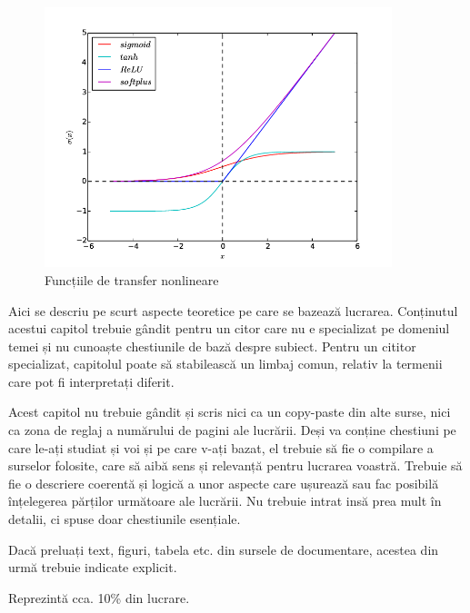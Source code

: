 \begin{figure}[h!]
    	\centering
	\captionsetup{justification=centering, margin=2cm}
	\includegraphics[width=0.9\textwidth]{figures/nonlinear_activation_functions.png}
	\caption{Funcțiile de transfer nonlineare \cite{non_lin_act_fun}}
	\label{fig:set of Gabor filters}
\end{figure}



\label{cap:fund-teoretice}

Aici se descriu pe scurt aspecte teoretice pe care se bazează lucrarea. Conținutul acestui capitol trebuie gândit pentru un citor care nu e specializat pe domeniul temei și nu cunoaște chestiunile de bază despre subiect. Pentru un cititor specializat, capitolul poate să stabilească un limbaj comun, relativ la termenii care pot fi interpretați diferit. 

Acest capitol nu trebuie gândit și scris nici ca un copy-paste din alte surse, nici ca zona de reglaj a numărului de pagini ale lucrării. Deși va conține chestiuni pe care le-ați studiat și voi și pe care v-ați bazat, el trebuie să fie o compilare a surselor folosite, care să aibă sens și relevanță pentru lucrarea voastră. Trebuie să fie o descriere coerentă și logică a unor aspecte care ușurează sau fac posibilă înțelegerea părților următoare ale lucrării. Nu trebuie intrat insă prea mult în detalii, ci spuse doar chestiunile esențiale. 

Dacă preluați text, figuri, tabela etc. din sursele de documentare, acestea din urmă trebuie indicate explicit. 

Reprezintă cca. 10\% din lucrare.